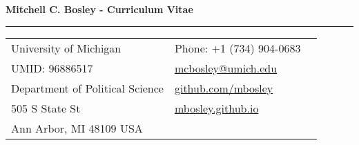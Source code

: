 \documentclass[letterpaper,11pt,oneside]{article}
\begin{document}

\noindent  \LARGE{\textbf{Mitchell C. Bosley - Curriculum Vitae}}  \\
\vspace{-2ex}
\hrule
\normalsize


\bigskip
\noindent
\begin{tabular}{@{} l l l}
  University of Michigan & \hspace{1in} Phone: +1 (734) 904-0683\\
  UMID: 96886517 & \hspace{1in} \href{mailto:mcbosley@umich.edu}{mcbosley@umich.edu} \\
  Department of Political Science & \hspace{1in} \url{github.com/mbosley}  \\
  505 S State St & \hspace{1in} \url{mbosley.github.io}  \\
  Ann Arbor, MI 48109 USA & \\
\end{tabular}


\vspace{1em}
\end{document}
